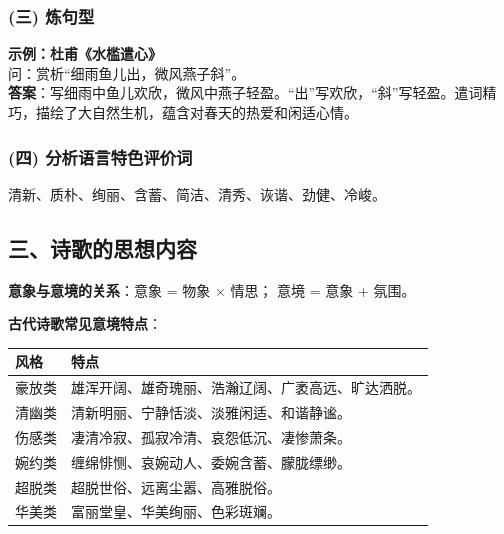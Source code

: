 \documentclass[11pt,a4paper]{article}
\renewenvironment{poembox}{
    \begin{tcolorbox}[
        enhanced,
        colback=boxbg,
        colframe=secondaryblue!30,
        boxrule=0.5pt,
        arc=2mm,
        left=5mm, right=5mm, top=3mm, bottom=3mm
    ]
    \small \itshape %
}{
    \end{tcolorbox}
}
\begin{document}
\subsubsection{(三) 炼句型}
\begin{poembox}
\textbf{示例：杜甫《水槛遣心》}\\
问：赏析“细雨鱼儿出，微风燕子斜”。\\
\textbf{答案}：写细雨中鱼儿欢欣，微风中燕子轻盈。“出”写欢欣，“斜”写轻盈。遣词精巧，描绘了大自然生机，蕴含对春天的热爱和闲适心情。
\end{poembox}

\subsubsection{(四) 分析语言特色评价词}
清新、质朴、绚丽、含蓄、简洁、清秀、诙谐、劲健、冷峻。

\subsection{三、诗歌的思想内容}
\textbf{意象与意境的关系}：意象 = 物象 $\times$ 情思； 意境 = 意象 + 氛围。

\textbf{古代诗歌常见意境特点}：

\begin{tcolorbox}[colback=white, colframe=primaryblue, title=常见意境风格, boxrule=0.5pt, sharp corners=downhill]
\begin{tabularx}{\textwidth}{@{}lX@{}}
\textbf{风格} & \textbf{特点} \\ \midrule
豪放类 & 雄浑开阔、雄奇瑰丽、浩瀚辽阔、广袤高远、旷达洒脱。 \\ \midrule
清幽类 & 清新明丽、宁静恬淡、淡雅闲适、和谐静谧。 \\ \midrule
伤感类 & 凄清冷寂、孤寂冷清、哀怨低沉、凄惨萧条。 \\ \midrule
婉约类 & 缠绵悱恻、哀婉动人、委婉含蓄、朦胧缥缈。 \\ \midrule
超脱类 & 超脱世俗、远离尘嚣、高雅脱俗。 \\ \midrule
华美类 & 富丽堂皇、华美绚丽、色彩斑斓。 \\
\end{tabularx}
\end{tcolorbox}
\end{document}
